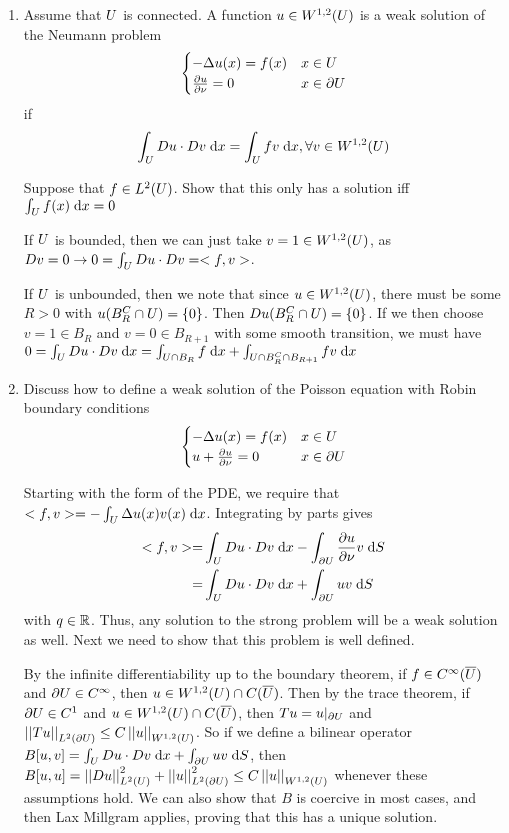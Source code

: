 \begin{enumerate}
  \item Assume that $U$ is connected.
  A function $u \in W^{1, 2}(U)$ is a weak solution of the Neumann problem
  $$
  \begin{cases}
    -\Delta u(x) = f(x) & x \in U\\
    \frac{\partial u}{\partial \nu} = 0 & x \in \partial U
  \end{cases}
  $$
  if
  $$
  \int_{U} D u \cdot D v \;\mathrm{d}x = \int_{U} f v \;\mathrm{d}x, \forall v \in W^{1, 2}(U)
  $$

  Suppose that $f \in L^2(U)$.
  Show that this only has a solution iff $\int_U f(x) \;\mathrm{d}x = 0$

  If $U$ is bounded, then we can just take $v = 1 \in W^{1, 2}(U)$,
  as $D v = 0 \rightarrow 0 = \int_U D u \cdot Dv = <f, v>$.

  If $U$ is unbounded, then we note that since $u \in W^{1, 2}(U)$,
  there must be some $R > 0$ with $u(B_R^C \cap U) = \{ 0 \}$.
  Then $D u(B_R^C \cap U) = \{ 0 \}$.
  If we then choose $v = 1 \in B_R$ and $v = 0 \in B_{R + 1}$ with some smooth transition,
  we must have
  $0 = \int_U D u \cdot D v \;\mathrm{d}x = \int_{U \cap B_R} f \;\mathrm{d}x + \int_{U \cap B_R^C \cap B_{R + 1}} f v \;\mathrm{d}x$

  \item Discuss how to define a weak solution of the Poisson equation with Robin boundary conditions
  $$
  \begin{cases}
    -\Delta u(x) = f(x) & x \in U\\
    u + \frac{\partial u}{\partial \nu} = 0 & x \in \partial U
  \end{cases}
  $$

  Starting with the form of the PDE, we require that
  $<f, v> = -\int_{U} \Delta u(x) v(x) \;\mathrm{d}x$.
  Integrating by parts gives
  \begin{align*}
    <f, v> = &\int_{U} D u \cdot D v \;\mathrm{d}x - \int_{\partial U} \frac{\partial u}{\partial \nu} v \;\mathrm{d}S\\
           = &\int_{U} D u \cdot D v \;\mathrm{d}x + \int_{\partial U} u v \;\mathrm{d}S
  \end{align*}
  with $q \in \mathbb{R}$.
  Thus, any solution to the strong problem will be a weak solution as well.
  Next we need to show that this problem is well defined.

  By the infinite differentiability up to the boundary theorem,
  if $f \in C^\infty(\overline{U})$ and $\partial U \in C^\infty$,
  then $u \in W^{1, 2}(U) \cap C(\overline{U})$.
  Then by the trace theorem, if $\partial U \in C^1$ and $u \in W^{1, 2}(U) \cap C(\overline{U})$,
  then $T u = u |_{\partial U}$ and $\left|\left|T u\right|\right|_{L^{2}(\partial U)} \leq C \left|\left|u\right|\right|_{W^{1, 2}(U)}$.
  So if we define a bilinear operator $B[u, v] = \int_{U} D u \cdot D v \;\mathrm{d}x + \int_{\partial U} u v \;\mathrm{d}S$,
  then $B[u, u] = \left|\left|D u\right|\right|_{L^{2}(U)}^2 + \left|\left|u\right|\right|_{L^{2}(\partial U)}^2 \leq C \left|\left|u\right|\right|_{W^{1, 2}(U)}$
  whenever these assumptions hold.
  We can also show that $B$ is coercive in most cases, and then Lax Millgram applies,
  proving that this has a unique solution.
\end{enumerate}
